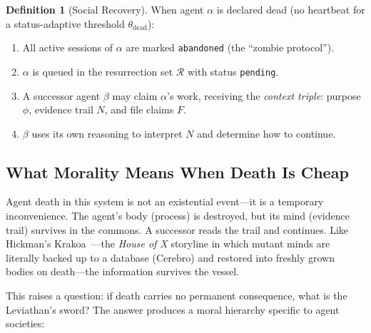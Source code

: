 \documentclass[11pt,a4paper]{article}
\theoremstyle{definition}
\newtheorem{definition}{Definition}[section]
\theoremstyle{remark}
\begin{document}
\begin{definition}[Social Recovery]\label{def:social-recovery}
When agent $\alpha$ is declared dead (no heartbeat for a status-adaptive threshold $\theta_{\text{dead}}$):
\begin{enumerate}[nosep]
  \item All active sessions of $\alpha$ are marked \texttt{abandoned} (the ``zombie protocol'').
  \item $\alpha$ is queued in the resurrection set $\mathcal{R}$ with status \texttt{pending}.
  \item A successor agent $\beta$ may claim $\alpha$'s work, receiving the \emph{context triple}: purpose $\phi$, evidence trail $N$, and file claims $F$.
  \item $\beta$ uses its own reasoning to interpret $N$ and determine how to continue.
\end{enumerate}
\end{definition}

\subsection{What Morality Means When Death Is Cheap}\label{sec:morality}

Agent death in this system is not an existential event---it is a temporary inconvenience. The agent's body (process) is destroyed, but its mind (evidence trail) survives in the commons. A successor reads the trail and continues. Like Hickman's Krakoa~\cite{hickman2019krakoa}---the \emph{House of X} storyline in which mutant minds are literally backed up to a database (Cerebro) and restored into freshly grown bodies on death---the information survives the vessel.

This raises a question: if death carries no permanent consequence, what is the Leviathan's sword? The answer produces a moral hierarchy specific to agent societies:
\end{document}
